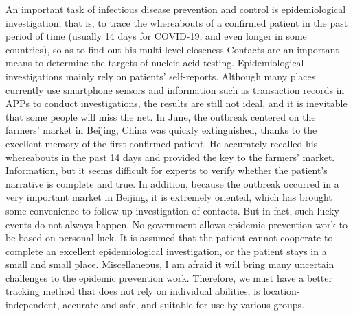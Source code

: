 \documentclass[conference]{IEEEtran}
\begin{document}
\par An important task of infectious disease prevention and control is epidemiological investigation, that is, to trace the whereabouts of a confirmed patient in the past period of time (usually 14 days for COVID-19, and even longer in some countries), so as to find out his multi-level closeness Contacts are an important means to determine the targets of nucleic acid testing. Epidemiological investigations mainly rely on patients' self-reports. Although many places currently use smartphone sensors and information such as transaction records in APPs to conduct investigations, the results are still not ideal, and it is inevitable that some people will miss the net. In June, the outbreak centered on the farmers’ market in Beijing, China was quickly extinguished, thanks to the excellent memory of the first confirmed patient. He accurately recalled his whereabouts in the past 14 days and provided the key to the farmers’ market. Information, but it seems difficult for experts to verify whether the patient’s narrative is complete and true. In addition, because the outbreak occurred in a very important market in Beijing, it is extremely oriented, which has brought some convenience to follow-up investigation of contacts. But in fact, such lucky events do not always happen. No government allows epidemic prevention work to be based on personal luck. It is assumed that the patient cannot cooperate to complete an excellent epidemiological investigation, or the patient stays in a small and small place. Miscellaneous, I am afraid it will bring many uncertain challenges to the epidemic prevention work. Therefore, we must have a better tracking method that does not rely on individual abilities, is location-independent, accurate and safe, and suitable for use by various groups.
\end{document}
